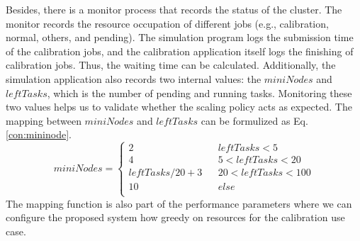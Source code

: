 Besides, there is a monitor process that records the status of the cluster.
The monitor records the resource occupation of different jobs (e.g., calibration, normal, others, and pending).
The simulation program logs the submission time of the calibration jobs, and the calibration application itself logs the finishing of calibration jobs.
Thus, the waiting time can be calculated.
Additionally, the simulation application also records two internal values: the $miniNodes$ and $leftTasks$, which is the number of pending and running tasks.
Monitoring these two values helps us to validate whether the scaling policy acts as expected.
The mapping between $miniNodes$ and $leftTasks$ can be formulized as Eq. \eqref{con:mininode}.
\begin{equation}
    miniNodes=\left\{
        \begin{aligned}
        2 &      & {leftTasks      <      5}\\
        4 &      & {5< leftTasks      <      20}\\
        leftTasks/20+3 &      & {20< leftTasks      <      100}\\
        10 &      & {else}\\
        \end{aligned}
        \right.\label{con:mininode}
\end{equation}
The mapping function is also part of the performance parameters where we can configure the proposed system how greedy on resources for the calibration use case.
 
